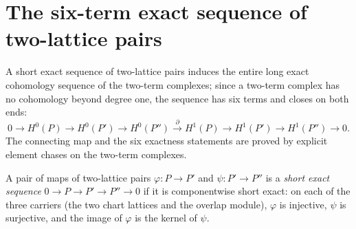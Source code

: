 \section{The six-term exact sequence of two-lattice pairs}
\label{sec:two_lattice_sixterm}

A short exact sequence of two-lattice pairs induces the entire long exact cohomology
sequence of the two-term complexes; since a two-term complex has no cohomology beyond
degree one, the sequence has six terms and closes on both ends:
\[
  0 \to H^0(P) \to H^0(P') \to H^0(P'')
    \xrightarrow{\ \partial\ } H^1(P) \to H^1(P') \to H^1(P'') \to 0 .
\]
The connecting map and the six exactness statements are proved by explicit element
chases on the two-term complexes.

\begin{definition}
  \label{def:twoLattice_shortExact}
  \leanok
  A pair of maps of two-lattice pairs \(\varphi : P \to P'\) and \(\psi : P' \to P''\)
  is a \emph{short exact sequence} \(0 \to P \to P' \to P'' \to 0\) if it is
  componentwise short exact: on each of the three carriers (the two chart lattices and
  the overlap module), \(\varphi\) is injective, \(\psi\) is surjective, and the image
  of \(\varphi\) is the kernel of \(\psi\).
\end{definition}

